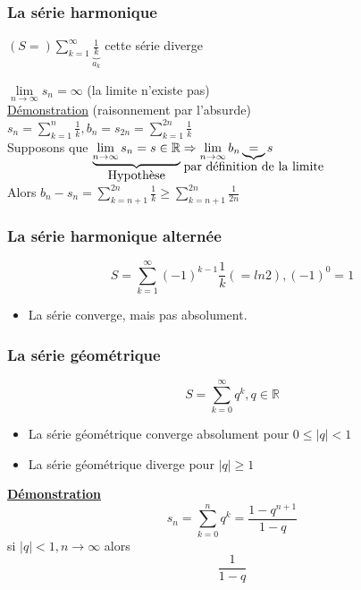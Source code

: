 \documentclass[12pt,a4paper]{article}
\newcommand{\somme}[2]{\ensuremath{\sum\limits_{#2}^{#1}}}
\newcommand{\limite}{\lim\limits_}
\newcommand{\evid}[1]{\textbf{\underline{#1}}}
\newcommand{\ninf}{\ensuremath{n \to \infty}}
\newcommand{\R}{\ensuremath{\mathbb{R}} }
\begin{document}
{\subsubsection{La série harmonique}
\begin{boite}[0.5]
$(S=) \sum^\infty_{k=1} \underbrace{\frac{1}{k}}_{a_k}$ cette série diverge
\end{boite}
$\limite{\ninf} s_n = \infty$ (la limite n'existe pas)\\
\underline{Démonstration} (raisonnement par l'absurde)\\
$s_n = \sum^n_{k=1} \frac{1}{k}, b_n = s_{2n} = \sum^{2n}_{k=1} \frac{1}{k}$\\
Supposons que $\underbrace{\limite{\ninf} s_n = s \in  \R}_{\mbox{Hypothèse}} \Rightarrow \limite{\ninf} b_n \underbrace{=}_{\mathclap{\mbox{par définition de la limite}}} s$\\
Alors $b_n-s_n = \sum^{2n}_{k = n+1} \frac{1}{k} \geq \sum^{2n}_{k=n+1} \frac{1}{2n}$
\subsubsection{La série harmonique alternée}
\begin{equation}
S= \somme{\infty}{k=1}(-1)^{k-1}\frac{1}{k} (=ln 2), (-1)^0 = 1
\end{equation}
\begin{itemize}
	\item La série converge, mais pas absolument.
\end{itemize}
\subsubsection{La série géométrique}
\begin{equation}
S = \somme{\infty}{k=0}q^k, q \in \R
\end{equation}
\begin{itemize}
	\item La série géométrique converge absolument pour $0 \leq |q| < 1$
	\item La série géométrique diverge pour $|q| \geq 1$
\end{itemize}
\evid{Démonstration}\\
\begin{equation}
s_n = \somme{n}{k=0}q^k = \frac{1-q^{n+1}}{1-q}	
\end{equation}
si $|q| < 1, n \to \infty$ alors
\begin{equation}
\frac{1}{1-q}
\end{equation}
}
\end{document}
